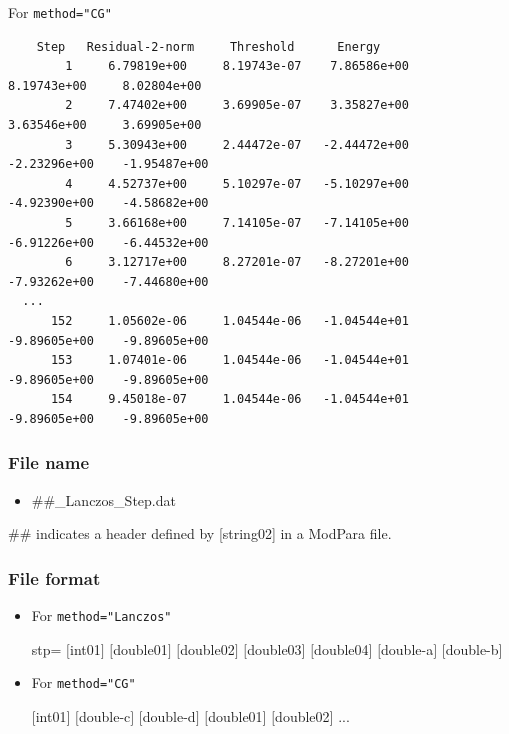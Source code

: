 \hspace{-2cm}
For \verb|method="CG"|
\\
\hspace{-2cm}
\begin{minipage}{19cm}
    \small
\begin{screen}
\begin{verbatim}
    Step   Residual-2-norm     Threshold      Energy
        1     6.79819e+00     8.19743e-07    7.86586e+00     8.19743e+00     8.02804e+00
        2     7.47402e+00     3.69905e-07    3.35827e+00     3.63546e+00     3.69905e+00
        3     5.30943e+00     2.44472e-07   -2.44472e+00    -2.23296e+00    -1.95487e+00
        4     4.52737e+00     5.10297e-07   -5.10297e+00    -4.92390e+00    -4.58682e+00
        5     3.66168e+00     7.14105e-07   -7.14105e+00    -6.91226e+00    -6.44532e+00
        6     3.12717e+00     8.27201e-07   -8.27201e+00    -7.93262e+00    -7.44680e+00
  ...
      152     1.05602e-06     1.04544e-06   -1.04544e+01    -9.89605e+00    -9.89605e+00
      153     1.07401e-06     1.04544e-06   -1.04544e+01    -9.89605e+00    -9.89605e+00
      154     9.45018e-07     1.04544e-06   -1.04544e+01    -9.89605e+00    -9.89605e+00
\end{verbatim}
\end{screen}
\normalsize
\end{minipage}

\subsubsection{File name}
 \begin{itemize}
   \item  \#\#\_Lanczos\_Step.dat
  \end{itemize}
 \#\# indicates a header defined by [string02] in a ModPara file.

\subsubsection{File format}

\begin{itemize}
\item For \verb|method="Lanczos"|

  stp= $[$int01$]$ $[$double01$]$ $[$double02$]$ $[$double03$]$ $[$double04$]$ $[$double-a$]$ $[$double-b$]$
\item For \verb|method="CG"|

  $[$int01$]$ $[$double-c$]$ $[$double-d$]$ $[$double01$]$ $[$double02$]$ ...
\end{itemize}

